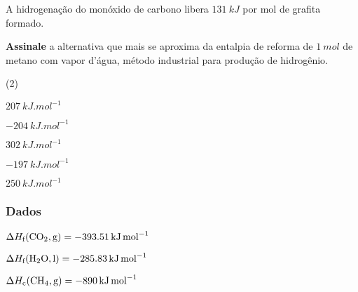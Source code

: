 \documentclass[braun, twocolumn]{braun}
\begin{document}
\begin{problem}
[2A21]A hidrogenação do monóxido de carbono libera \(\qty{131}{kJ}\) por mol de
grafita formado.

\textbf{Assinale} a alternativa que mais se aproxima da entalpia de
reforma de \(\qty{1}{mol}\) de metano com vapor d'água, método industrial
para produção de hidrogênio.


\begin{choices}
(2)
\item \(\qty{+207}{kJ.mol^{-1}}\)

\item \(\qty{-204}{kJ.mol^{-1}}\)

\item \(\qty{+302}{kJ.mol^{-1}}\)

\item \(\qty{-197}{kJ.mol^{-1}}\)

\item \(\qty{+250}{kJ.mol^{-1}}\)

\end{choices}
\subsubsection*{Dados}


\begin{datalist}

\item $\Delta H_\text{f}(\ce{CO2, {g}}) = \qty{-393,51}{kJ.mol^{-1}}$
\item $\Delta H_\text{f}(\ce{H2O, {l}}) = \qty{-285,83}{kJ.mol^{-1}}$
\item $\Delta H_\text{c}(\ce{CH4, {g}}) = \qty{-890}{kJ.mol^{-1}}$
\end{datalist}

\end{problem}
\end{document}
